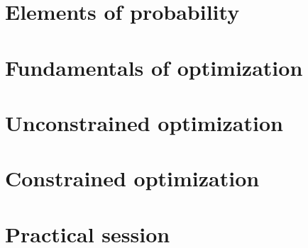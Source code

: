 \documentclass[letterpaper,10pt,english]{jupyterBook}
\begin{document}
\sphinxstepscope


\chapter{Elements of probability}
\label{\detokenize{05.probability:elements-of-probability}}\label{\detokenize{05.probability::doc}}

\sphinxstepscope


\chapter{Fundamentals of optimization}
\label{\detokenize{06.optimization_fundamentals:fundamentals-of-optimization}}\label{\detokenize{06.optimization_fundamentals::doc}}

\sphinxstepscope


\chapter{Unconstrained optimization}
\label{\detokenize{07.unconstrained:unconstrained-optimization}}\label{\detokenize{07.unconstrained::doc}}

\sphinxstepscope


\chapter{Constrained optimization}
\label{\detokenize{08.constrained:constrained-optimization}}\label{\detokenize{08.constrained::doc}}

\sphinxstepscope


\chapter{Practical session}
\label{\detokenize{09.practical_session:practical-session}}\label{\detokenize{09.practical_session::doc}}
\end{document}
